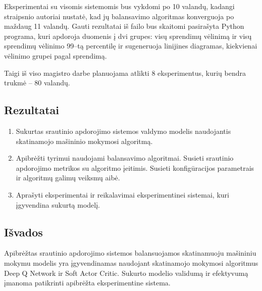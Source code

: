 \documentclass{VUMIFPSbakalaurinis}
\begin{document}
Eksperimentai su visomis sistemomis bus vykdomi po 10 valandų, kadangi \cite{vaquero2018autotuning} straipsnio autoriai nustatė, kad jų balansavimo algoritmas konverguoja po maždaug 11 valandų. 
Gauti rezultatai iš failo bus skaitomi pasirašyta Python programa, kuri apdoroja duomenis į dvi grupes: visų sprendimų vėlinimą ir visų sprendimų vėlinimo 99–tą percentilę ir sugeneruoja linijines diagramas, kiekvienai vėlinimo grupei pagal sprendimą.

Taigi iš viso magistro darbe planuojama atlikti 8 eksperimentus, kurių bendra trukmė – 80 valandų.



\subsection*{Rezultatai}
\begin{enumerate}
    \item Sukurtas srautinio apdorojimo sistemos valdymo modelis naudojantis skatinamojo mašininio mokymosi algoritmą. 
    \item Apibrėžti tyrimui naudojami balansavimo algoritmai. Susieti srautinio apdorojimo metrikos su algoritmo įeitimis. Susieti konfigūracijos parametrais ir algoritmų galimų veiksmų aibė.
    \item Aprašyti eksperimentai ir reikalavimai eksperimentinei sistemai, kuri įgyvendina sukurtą modelį.
\end{enumerate}
\subsection*{Išvados}
    Apibrėžtas srautinio apdorojimo sistemos balansuojamos skatinamuoju mašininiu mokymu modelis yra įgyvendinamas naudojant skatinamojo mokymosi algoritmus Deep Q Network ir Soft Actor Critic. Sukurto modelio validumą ir efektyvumą įmanoma patikrinti apibrėžta eksperimentine sistema.
\printbibliography[heading=bibintoc] 
\end{document}
